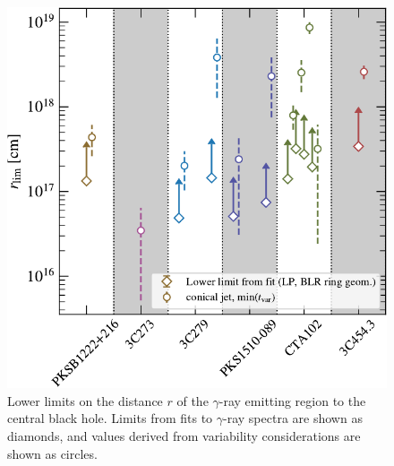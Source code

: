 \documentclass[twocolumn]{aastex62}
\newcommand{\gray}{$\gamma$-ray\xspace}
\begin{document}
\begin{figure}
    \centering
    \includegraphics[width = .9\linewidth]{limits.pdf}
    \caption{Lower limits on the distance $r$ of the \gray emitting region to the central black hole. Limits from fits to \gray spectra are shown as diamonds, and values derived from variability considerations are shown as circles. }
    \label{fig:blr_limits}
\end{figure}
\end{document}
